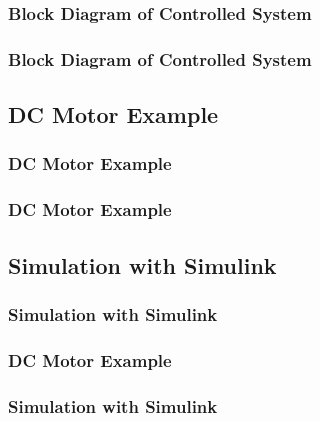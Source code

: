 \documentclass[fleqn]{beamer} %
\newcommand{\sectionIIsubsectionItitle}{Block Diagram of Controlled System}
\newcommand{\sectionIIsubsectionIItitle}{DC Motor Example}
\newcommand{\sectionIIsubsectionIIItitle}{Simulation with Simulink}
\begin{document}
			\begin{frame}[label=sectionIIsubsectionI]
				\frametitle{\sectionIIsubsectionItitle}
				\bigskip

				\btVFill
			\end{frame}

			\begin{frame}[label=sectionIIsubsectionI]
				\frametitle{\sectionIIsubsectionItitle}
				\bigskip

				\btVFill
			\end{frame}


		\subsection{\sectionIIsubsectionIItitle}\label{sectionIIsubsectionII}

			\begin{frame}

				\frametitle{\sectionIIsubsectionIItitle}
				\bigskip

				\btVFill 
			\end{frame}

			\begin{frame}

				\frametitle{\sectionIIsubsectionIItitle}
				\bigskip

				\btVFill 
			\end{frame}




		\subsection{\sectionIIsubsectionIIItitle}\label{sectionIIsubsectionIII}

			\begin{frame}
				\frametitle{\sectionIIsubsectionIIItitle}
				\bigskip


				\btVFill 
			\end{frame}	


			\begin{frame}
				\frametitle{\sectionIIsubsectionIItitle}
				\bigskip
								
				\btVFill 
			\end{frame}	


			\begin{frame}
				\frametitle{\sectionIIsubsectionIIItitle}
				\bigskip

				
				\btVFill 
			\end{frame}
\end{document}
